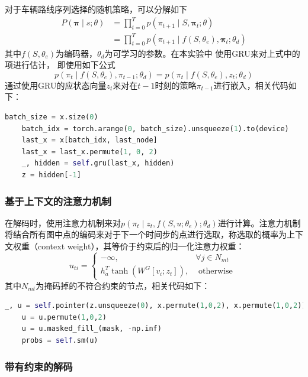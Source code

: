 \documentclass[withoutpreface,bwprint]{cumcmthesis} %
\begin{document}
对于车辆路线序列选择的随机策略，可以分解如下
$$
\begin{aligned}
P(\boldsymbol{\pi} \mid s ; \theta) &=\prod_{t=0}^{T} p\left(\pi_{t+1} \mid S, \boldsymbol{\pi}_{t} ; \theta\right) \\
&=\prod_{t=0}^{T} p\left(\pi_{t+1} \mid f\left(S, \theta_{e}\right), \boldsymbol{\pi}_{t} ; \theta_{d}\right)
\end{aligned}
$$
其中$f\left(S, \theta_{e}\right)$为编码器，$\theta_{d}$为可学习的参数。在本实验中 使用GRU来对上式中的项进行估计，
即使用如下公式
$$
p\left(\pi_{t} \mid f\left(S, \theta_{e}\right), \pi_{t-1} ; \theta_{d}\right)=p\left(\pi_{t} \mid f\left(S, \theta_{e}\right), z_{t} ; \theta_{d}\right)
$$
通过使用GRU的应状态向量$z_t$来对在$t-1$时刻的策略$\pi_{t-1}$进行嵌入，相关代码如下：
\begin{lstlisting}[language=python]
	batch_size = x.size(0)
	batch_idx = torch.arange(0, batch_size).unsqueeze(1).to(device)
	last_x = x[batch_idx, last_node]
	last_x = last_x.permute(1, 0, 2)
	_, hidden = self.gru(last_x, hidden)
	z = hidden[-1]
\end{lstlisting}

\subsubsection{基于上下文的注意力机制}

在解码时，使用注意力机制来对$
p\left(\pi_{t} \mid z_{t}, f\left(S, u ; \theta_{e}\right) ; \theta_{d}\right)
$进行计算。注意力机制将结合所有图中点的编码来对于下一个时间步的点进行选取，称选取的概率为上下文权重（context weight）\cite{1}，其等价于约束后的归一化注意力权重：
$$
u_{t i}=\left\{\begin{array}{ll}
-\infty, & \forall j \in N_{m t} \\
h_{a}^{T} \tanh \left(W^{G}\left[v_{i} ; z_{t}\right]\right), & \text { otherwise }
\end{array}\right.
$$
其中$N_{m t}$为掩码掉的不符合约束的节点，相关代码如下：
\begin{lstlisting}[language=python]
	_, u = self.pointer(z.unsqueeze(0), x.permute(1,0,2), x.permute(1,0,2))
	u = u.permute(1,0,2)
	u = u.masked_fill_(mask, -np.inf)
	probs = self.sm(u)
\end{lstlisting}


\subsubsection{带有约束的解码}
\end{document}

